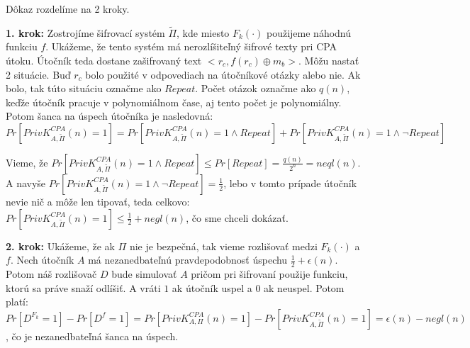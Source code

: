 \begin{dokaz}
Dôkaz rozdelíme na 2 kroky.

{\bf 1. krok:} Zostrojíme šifrovací systém $\tilde{\Pi}$, kde miesto $F_k(\cdot)$ použijeme
náhodnú funkciu $f$. Ukážeme, že tento systém má nerozlíšiteľný šifrové texty pri CPA útoku.
Útočník teda dostane zašifrovaný text $<r_c, f(r_c) \oplus m_b>$.
Môžu nastať 2 situácie. Buď $r_c$ bolo použité v odpovediach na útočníkové otázky alebo nie. Ak bolo, tak túto situáciu
označme ako $Repeat$. Počet otázok označme ako $q(n)$, keďže útočník pracuje v polynomiálnom čase, aj
tento počet je polynomiálny. Potom šanca na úspech útočníka je nasledovná:
$$Pr[PrivK_{A,\tilde{\Pi}}^{CPA}(n)=1] = Pr[PrivK_{A,\tilde{\Pi}}^{CPA}(n)=1\land Repeat]  + Pr[PrivK_{A,\tilde{\Pi}}^{CPA}(n)=1 \land \neg Repeat]$$

Vieme, že $Pr[PrivK_{A,\tilde{\Pi}}^{CPA}(n)=1\land Repeat] \leq Pr[Repeat] = \frac{q(n)}{2^n} = neql(n)$.
A navyše $Pr[PrivK_{A,\tilde{\Pi}}^{CPA}(n)=1\land \neg Repeat] = \frac{1}{2}$, lebo v tomto prípade útočník
nevie nič a môže len tipovať, teda celkovo: $Pr[PrivK_{A,\tilde{\Pi}}^{CPA}(n)=1] \leq \frac{1}{2} + negl(n)$, čo sme chceli dokázať.

{\bf 2. krok:} Ukážeme, že ak $\Pi$ nie je bezpečná, tak vieme rozlišovať medzi $F_k(\cdot)$ a $f$.
Nech útočník $A$ má nezanedbateľnú pravdepodobnosť úspechu $\frac{1}{2}+\epsilon(n)$. 
Potom náš rozlišovač $D$ bude simulovať $A$ pričom pri šifrovaní použije funkciu, ktorú sa práve 
snaží odlíšiť. A vráti $1$ ak útočník uspel a $0$ ak neuspel.
Potom platí: $Pr[D^{F_k} = 1] - Pr[D^f = 1] = Pr[PrivK_{A,\Pi}^{CPA}(n)=1] - Pr[PrivK_{A,\tilde{\Pi}}^{CPA}(n)=1] 
= \epsilon(n) - negl(n)$, čo je nezanedbateľná šanca na úspech.
\end{dokaz}





